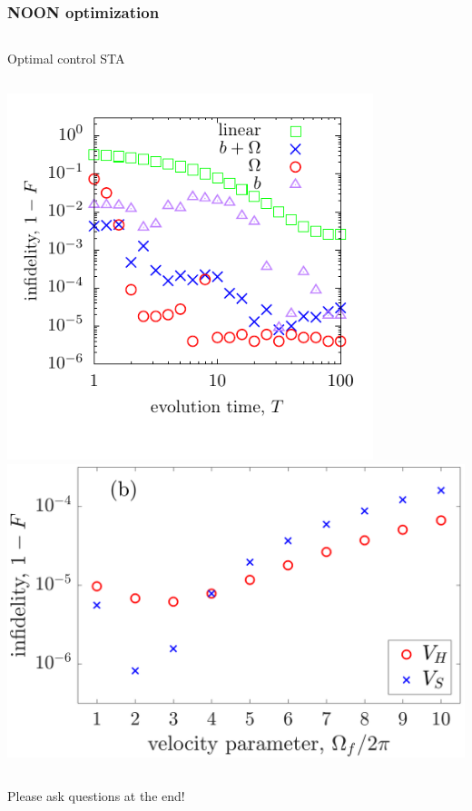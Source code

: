 \documentclass{beamer}
\begin{document}
\begin{frame}
\frametitle{NOON optimization}

\begin{columns}
\center Optimal control
\center STA
\end{columns}

\begin{columns}
\center \includegraphics[width=0.8\textwidth]{../data/1d/figlfid.pdf}
\center \includegraphics[width=\textwidth]{../data/1d/fig6.png}
\end{columns}

\center Please ask questions at the end!
\end{frame}
\end{document}
